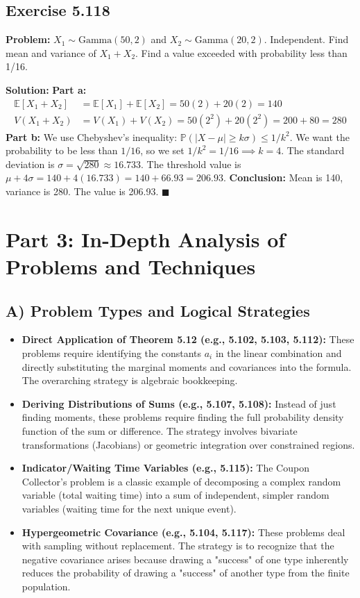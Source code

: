 \documentclass[11pt, a4paper]{article}
\theoremstyle{definition}
\theoremstyle{remark}
\newcommand{\E}{\mathbb{E}}
\newcommand{\Prob}{\mathbb{P}}
\begin{document}
\subsection{Exercise 5.118}
\textbf{Problem:} $X_1 \sim \text{Gamma}(50, 2)$ and $X_2 \sim \text{Gamma}(20, 2)$. Independent. Find mean and variance of $X_1+X_2$. Find a value exceeded with probability less than 1/16.

\textbf{Solution:}
\textbf{Part a:}
\begin{align*}
\E[X_1+X_2] &= \E[X_1] + \E[X_2] = 50(2) + 20(2) = 140 \\
V(X_1+X_2) &= V(X_1) + V(X_2) = 50(2^2) + 20(2^2) = 200 + 80 = 280
\end{align*}
\textbf{Part b:} We use Chebyshev's inequality: $\Prob(|X - \mu| \ge k\sigma) \le 1/k^2$.
We want the probability to be less than $1/16$, so we set $1/k^2 = 1/16 \implies k = 4$.
The standard deviation is $\sigma = \sqrt{280} \approx 16.733$.
The threshold value is $\mu + 4\sigma = 140 + 4(16.733) = 140 + 66.93 = 206.93$.
\textbf{Conclusion:} Mean is 140, variance is 280. The value is 206.93. $\blacksquare$

\newpage
\section{Part 3: In-Depth Analysis of Problems and Techniques}

\subsection{A) Problem Types and Logical Strategies}
\begin{itemize}
    \item \textbf{Direct Application of Theorem 5.12 (e.g., 5.102, 5.103, 5.112):} These problems require identifying the constants $a_i$ in the linear combination and directly substituting the marginal moments and covariances into the formula. The overarching strategy is algebraic bookkeeping.
    \item \textbf{Deriving Distributions of Sums (e.g., 5.107, 5.108):} Instead of just finding moments, these problems require finding the full probability density function of the sum or difference. The strategy involves bivariate transformations (Jacobians) or geometric integration over constrained regions.
    \item \textbf{Indicator/Waiting Time Variables (e.g., 5.115):} The Coupon Collector's problem is a classic example of decomposing a complex random variable (total waiting time) into a sum of independent, simpler random variables (waiting time for the next unique event).
    \item \textbf{Hypergeometric Covariance (e.g., 5.104, 5.117):} These problems deal with sampling without replacement. The strategy is to recognize that the negative covariance arises because drawing a "success" of one type inherently reduces the probability of drawing a "success" of another type from the finite population.
\end{itemize}
\end{document}
